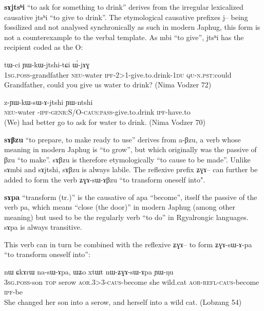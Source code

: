\documentclass[oldfontcommands,oneside,a4paper,11pt]{memoir}
\newcommand{\ipa}[1]{{\phon #1}} %
\newcommand{\aor}{\textsc{aor}}
\newcommand{\caus}{\textsc{caus}}
\newcommand{\du}{\textsc{du}}
\newcommand{\genr}{\textsc{genr}}
\newcommand{\ipf}{\textsc{ipf}}
\newcommand{\neu}{\textsc{neu}}
\newcommand{\npst}{\textsc{n.pst}}
\newcommand{\pass}{\textsc{pass}}
\newcommand{\poss}{\textsc{poss}}
\newcommand{\qu}{\textsc{qu}}
\newcommand{\refl}{\textsc{refl}}
\newcommand{\sg}{\textsc{sg}}
\newcommand{\topic}{\textsc{top}}
\begin{document}
  
  
    \textbf{\ipa{sɤjtsʰi}} ``to ask for something to drink'' derives from the irregular lexicalized causative \ipa{jtsʰi} ``to give to drink''. The etymological causative prefixes \ipa{j}-- being fossilized and not analysed synchronically as such in modern Japhug, this form is not a counterexample to the verbal template. As \ipa{mbi} ``to give'', \ipa{jtsʰi} has the recipient coded as the O:
      \begin{exe}
\ex
\gll   \ipa{a-wɯ} 	\ipa{tɯ-ci} 	\ipa{ɲɯ-kɯ-jtshi-tɕi} 	\ipa{ɯ́-jɤɣ}  \\
1\sg{}.\poss{}-grandfather \neu{}-water \ipf{}-2>1-give.to.drink-1\du{} \qu{}-\npst{}:could \\
 \glt Grandfather, could you give us water to drink? (Nima Vodzer 72)
\end{exe}   
 
    
    \begin{exe}
\ex
\gll   \ipa{tɯ-ci} 	\ipa{z-ɲɯ-kɯ-sɯ-ɤ-jtshi} 	\ipa{ɲɯ-ntshi}  \\
\neu{}-water \transl{}-\ipf{}-\genr{}:S/O-\caus{}:\pass{}-give.to.drink \ipf{}-have.to  \\
 \glt  (We) had better go to ask for water to drink.   (Nima Vodzer 70)
\end{exe} 
  
  \textbf{\ipa{sɤβzu}} ``to prepare, to make ready to use'' derives from \ipa{a-βzu}, a verb whose meaning in modern Japhug is ``to grow'', but which originally was the passive of \ipa{βzu} ``to make''. \ipa{sɤβzu}  is therefore etymologically ``to cause to be made''. Unlike   \ipa{sɤmbi} and \ipa{sɤjtshi}, \ipa{sɤβzu} is always labile. The reflexive prefix \ipa{ʑɣɤ}-- can further be added to form the verb \ipa{ʑɣɤ-sɯ-ɤβzu} ``to transform oneself into".

  \textbf{\ipa{sɤpa}} ``transform (tr.)'' is the causative of \ipa{apa} ``become'', itself the passive of the verb \ipa{pa}, which means ``close (the door)'' in modern Japhug (among other meaning) but used to be the  regularly verb ``to do'' in Rgyalrongic languages. \ipa{sɤpa} is always transitive.
  
  This verb can in turn be combined with the reflexive \ipa{ʑɣɤ}-- to form \ipa{ʑɣɤ-sɯ-ɤ-pa} ``to transform oneself into'':
  
  \begin{exe}
\ex
\gll \ipa{ɯ-tɕɯ} 	\ipa{nɯ} 	\ipa{ɕkɤrɯ} 	\ipa{na-sɯ-ɤpa,} 	\ipa{ɯʑo} 	\ipa{xtɯt} 	\ipa{nɯ-ʑɣɤ-sɯ-ɤpa} 	\ipa{ɲɯ-ŋu} \\
3\sg{}.\poss{}-son \topic{} serow \aor{}.3>3-\caus{}-become she wild.cat \aor{}-\refl{}-\caus{}-become \ipf{}-be\\
 \glt She changed her son into a serow, and herself into a wild cat.  (Lobzang 54)
\end{exe} 
\end{document}
